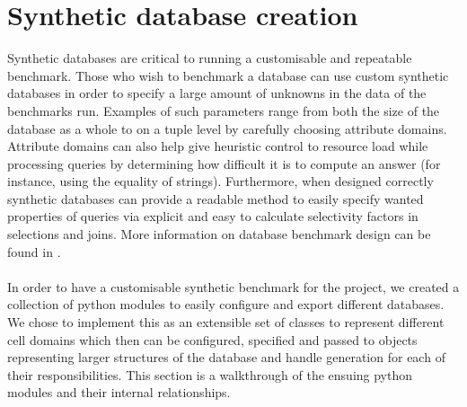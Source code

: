 \section{Synthetic database creation}\label{sec:benchmark:database}
Synthetic databases are critical to running a customisable and repeatable
benchmark. Those who wish to benchmark a database can use custom synthetic
databases in order to specify a large amount of unknowns in the data of the
benchmarks run. Examples of such parameters range from both the size of the
database as a whole to on a tuple level by carefully choosing attribute domains.
Attribute domains can also help give heuristic control to resource load while
processing queries by determining how difficult it is to compute an answer (for
instance, using the equality of strings). Furthermore, when designed correctly synthetic
databases can provide a readable method to easily specify wanted properties of
queries via explicit and easy to calculate selectivity factors in selections and
joins. More information on database benchmark design can be found in
.

\paragraph{} In order to have a customisable synthetic benchmark for the
project, we created a collection of python modules to easily configure and
export different databases. We chose to implement this as an extensible set of
classes to represent different cell domains which then can be configured,
specified and passed to objects representing larger structures of the database
and handle generation for each of their responsibilities. This section is a
walkthrough of the ensuing python modules and their internal relationships.

